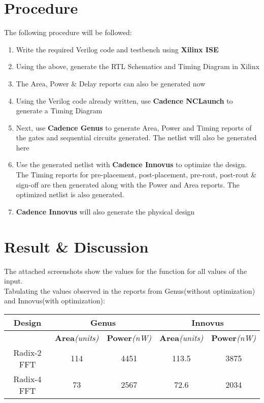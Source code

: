 \documentclass[a4paper,10pt]{report}
\begin{document}
\section{Procedure}
The following procedure will be followed:
\begin{enumerate}
	\item Write the required Verilog code and testbench using \textbf{Xilinx ISE}
	\item Using the above, generate the RTL Schematics and Timing Diagram in Xilinx
	\item The Area, Power \& Delay reports can also be generated now
	\item Using the Verilog code already written, use \textbf{Cadence NCLaunch} to generate a Timing Diagram
	\item Next, use \textbf{Cadence Genus} to generate Area, Power and Timing reports of the gates and sequential circuits generated. The netlist will also be generated here
	\item Use the generated netlist with \textbf{Cadence Innovus} to optimize the design. The Timing reports for pre-placement, post-placement, pre-rout, post-rout \& sign-off are then generated along with the Power and Area reports. The optimized netlist is also generated.
	\item \textbf{Cadence Innovus} will also generate the physical design
\end{enumerate}

\section{Result \& Discussion}

The attached screenshots show the values for the function for all values of the input. \\
Tabulating the values observed in the reports from Genus(without optimization) and Innovus(with optimization): \\

\begin{tabular}{|c|c|c|c|c|}
	\hline
	\textbf{Design} & \multicolumn{2}{|c|}{\textbf{Genus}} & \multicolumn{2}{|c|}{\textbf{Innovus}} \\
	\hline
     & \textbf{Area}\textit{(units)} & \textbf{Power}\textit{(nW)} & \textbf{Area}\textit{(units)} & \textbf{Power}\textit{(nW)} \\
     \hline
     Radix-2 FFT & 114 & 4451 & 113.5 & 3875  \\
     \hline
     Radix-4 FFT & 73 & 2567 & 72.6 & 2034 \\
     \hline

\end{tabular} \\
\\
\end{document}
